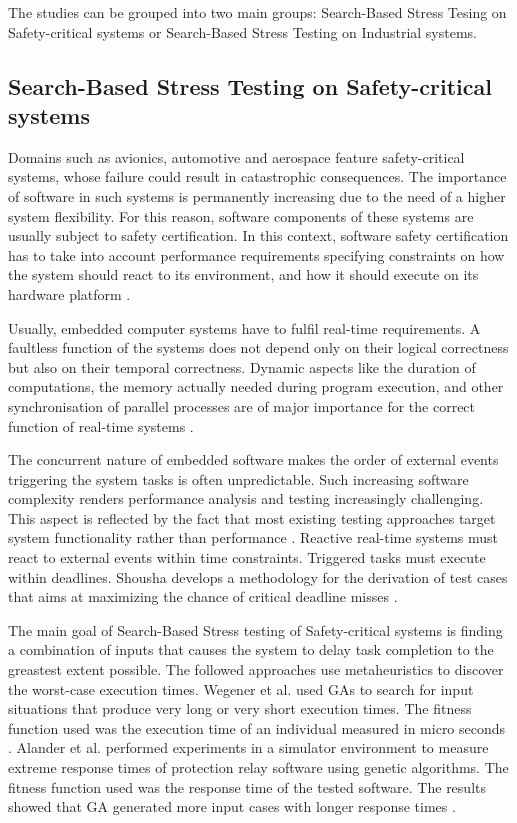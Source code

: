 \documentclass{report}
\begin{document}
The studies can be grouped into two main groups: Search-Based Stress Tesing on Safety-critical systems or Search-Based Stress Testing on Industrial systems.


\subsection{Search-Based Stress Testing on Safety-critical systems}

Domains such as avionics, automotive and aerospace feature safety-critical systems, whose failure could result in catastrophic consequences.  The importance
of software in such systems is permanently increasing due to the need of a higher system
flexibility. For this reason, software components of these systems are usually subject to safety certification. In this context, software safety certification has to take into account performance requirements specifying constraints on how the system should react to its environment, and how it should execute on its hardware platform \cite{DiAlesio2013}.

Usually, embedded computer systems have to fulfil real-time requirements. A faultless function of the systems does not depend only on their logical correctness but also on their temporal correctness. Dynamic aspects like the duration of computations, the memory actually needed during program execution, and other synchronisation of parallel processes are of major importance for the correct function of real-time systems  \cite{J.WegenerK.GrimmM.GrochtmannH.Sthamer1996} .

The concurrent nature of embedded software makes  the order of external events triggering the system tasks is often unpredictable. Such increasing software complexity
renders performance analysis and testing increasingly
challenging. This aspect is reflected by the fact that most existing testing approaches target system functionality rather than performance \cite{DiAlesio2013}. Reactive real-time systems must react to external events within time constraints. Triggered tasks must execute within deadlines. Shousha develops a methodology for the derivation of test cases that aims at maximizing the chance of critical deadline misses \cite{shousha2003performance}.

The main goal of Search-Based Stress testing of Safety-critical systems is finding a combination of inputs that causes the system to delay task completion to the greastest extent possible. The followed approaches use metaheuristics to discover the worst-case execution times. Wegener et al. \cite{Wegener1997} used GAs to search for input situations that produce very long or very short execution times. The fitness function used was the execution time of an individual measured in micro seconds \cite{Wegener1997}. Alander et al. \cite{Alander} performed experiments in a simulator environment to measure extreme response times of protection relay software using genetic algorithms. The fitness function used was the response time of the tested software. The results showed that GA generated more input cases with longer response times \cite{Alander}.
\end{document}
